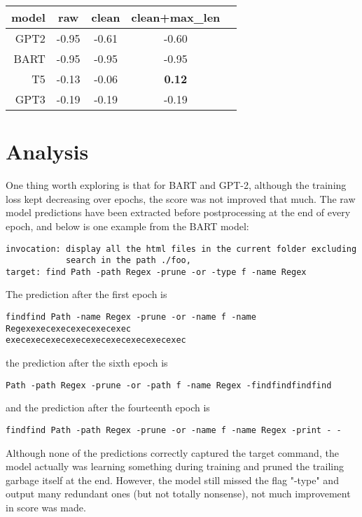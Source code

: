 \documentclass{article}
\begin{document}
\begin{center}
	\begin{tabular}{rcccc}
		\toprule
		model & raw   & clean & clean+max\_len \\
		\midrule
		GPT2  & -0.95 & -0.61 & -0.60          \\
		BART  & -0.95 & -0.95 & -0.95          \\
		T5    & -0.13 & -0.06 & \textbf{0.12}  \\
		\hline
		GPT3  & -0.19 & -0.19 & -0.19          \\
		\bottomrule
	\end{tabular}
\end{center}

\section{Analysis}
One thing worth exploring is that for BART and GPT-2, although the training loss kept decreasing over epochs, the score was not improved that much. The raw model predictions have been extracted before postprocessing at the end of every epoch, and below is one example from the BART model:
\begin{verbatim}
invocation: display all the html files in the current folder excluding 
            search in the path ./foo,
target: find Path -path Regex -prune -or -type f -name Regex
\end{verbatim}
The prediction after the first epoch is
\begin{verbatim}
findfind Path -name Regex -prune -or -name f -name Regexexecexecexecexecexec
execexecexecexecexecexecexecexecexec
\end{verbatim}
the prediction after the sixth epoch is
\begin{verbatim}
Path -path Regex -prune -or -path f -name Regex -findfindfindfind
\end{verbatim}
and the prediction after the fourteenth epoch is
\begin{verbatim}
findfind Path -path Regex -prune -or -name f -name Regex -print - -
\end{verbatim}
Although none of the predictions correctly captured the target command, the model actually was learning something during training and pruned the trailing garbage itself at the end. However, the model still missed the flag "-type" and output many redundant ones (but not totally nonsense), not much improvement in score was made.
\end{document}
